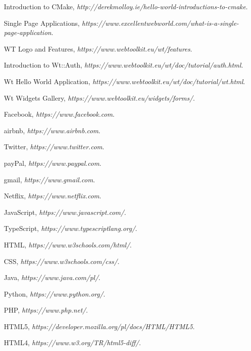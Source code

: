 \documentclass[a4paper,12pt]{book}
\begin{document}
\begin{thebibliography}{9}
  Introduction to CMake,
  \emph{http://derekmolloy.ie/hello-world-introductions-to-cmake}.
  
  Single Page Applications,
  \emph{https://www.excellentwebworld.com/what-is-a-single-page-application}.
  
  WT Logo and Features,
  \emph{https://www.webtoolkit.eu/wt/features}.

  Introduction to Wt::Auth,
  \emph{https://www.webtoolkit.eu/wt/doc/tutorial/auth.html}.
  
  Wt Hello World Application,
  \emph{https://www.webtoolkit.eu/wt/doc/tutorial/wt.html}.

  Wt Widgets Gallery,
  \emph{https://www.webtoolkit.eu/widgets/forms/}.
  
  Facebook,
  \emph{https://www.facebook.com}.
  
  airbnb,
  \emph{https://www.airbnb.com}.
  
  Twitter,
  \emph{https://www.twitter.com}.
  
  payPal,
  \emph{https://www.paypal.com}.
  
  gmail,
  \emph{https://www.gmail.com}.
  
  Netflix,
  \emph{https://www.netflix.com}.

  JavaScript,
  \emph{https://www.javascript.com/}.
  
  TypeScript,
  \emph{https://www.typescriptlang.org/}.
  
  HTML,
  \emph{https://www.w3schools.com/html/}.
  
  CSS,
  \emph{https://www.w3schools.com/css/}.
 
  Java,
  \emph{https://www.java.com/pl/}.
  
  Python,
  \emph{https://www.python.org/}.
  
  PHP,
  \emph{https://www.php.net/}.
  
  HTML5,
  \emph{https://developer.mozilla.org/pl/docs/HTML/HTML5}.
  
  HTML4,
  \emph{https://www.w3.org/TR/html5-diff/}.
  

\end{thebibliography}
\end{document}
